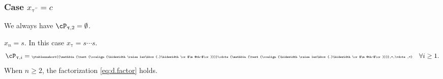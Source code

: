 \documentclass[12pt,a4paper]{amsart}
\makeatletter
\numberwithin{equation}{section}
\theoremstyle{remark}
\let\ytb=\ytableaushort
\newcommand{\tytb}[1]{{\tiny\ytb{#1}}}
\newcommand{\dotminus}{\mathbin{\text{\@dotminus}}}
\newcommand{\@dotminus}{%
  \ooalign{\hidewidth\raise1ex\hbox{.}\hidewidth\cr$\m@th-$\cr}%
}
\def\pcL{\cL^+}
\def\ncL{\cL^-}
\def\uptaupp{\uptau^{\prime\prime}}
\def\uum{{\dotminus}}
\makeatother
\begin{document}
{\begin{enumT}
  \end{enumT}


  \subsubsection{Case $x_{\uptaupp}=c$}\label{sec:z.c}
  We always have $\cP_{\uptau,2}=\emptyset$.
  \begin{enumT}
    \item  $x_{n} =  s$. In this case $x_{\uptau}=s\cdots s$.
    \begin{equation}\label{eq:ss.c}
      \cP_{\uptau,i} = \tytb{\uum\cdots\uum,=,\vdots,=} \quad \forall i\geq 1.
    \end{equation}
    When $n\geq 2$, the  factorization \eqref{eq:d.factor} holds.


\end{enumT}}
\end{document}
